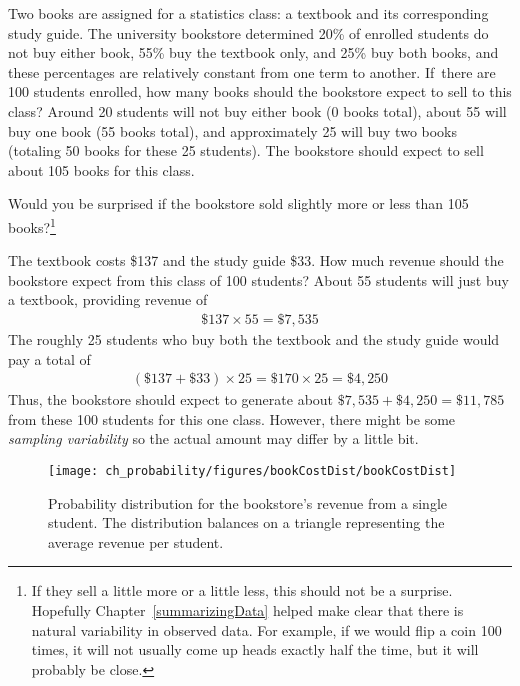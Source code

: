
\begin{example}{Two books are assigned for a statistics class: a textbook and its corresponding study guide. The university bookstore determined 20\% of enrolled students do not buy either book, 55\% buy the textbook only, and 25\% buy both books, and these percentages are relatively constant from one term to another. If~there are 100 students enrolled, how many books should the bookstore expect to sell to this class?}\label{bookStoreSales}
Around 20 students will not buy either book (0 books total), about 55 will buy one book (55 books total), and approximately 25 will buy two books (totaling 50 books for these 25 students). The bookstore should expect to sell about 105 books for this class.
\end{example}

\begin{exercise}
Would you be surprised if the bookstore sold slightly more or less than 105 books?\footnote{If they sell a little more or a little less, this should not be a surprise. Hopefully Chapter~\ref{summarizingData} helped make clear that there is natural variability in observed data. For example, if we would flip a coin 100 times, it will not usually come up heads exactly half the time, but it will probably be close.}
\end{exercise}

\begin{example}{The textbook costs \$137 and the study guide \$33. How much revenue should the bookstore expect from this class of 100 students?}\label{bookStoreRev}
About 55 students will just buy a textbook, providing revenue of
\begin{eqnarray*}
\$137 \times  55 = \$7,535
\end{eqnarray*}
The roughly 25 students who buy both the textbook and the study guide would pay a total of
\begin{eqnarray*}
(\$137 + \$33) \times  25 = \$170 \times  25 = \$4,250
\end{eqnarray*}
Thus, the bookstore should expect to generate about $\$7,535 + \$4,250 = \$11,785$ from these 100 students for this one class. However, there might be some \emph{sampling variability} so the actual amount may differ by a little bit.
\end{example}

\begin{figure}[hhh]
\centering
\texttt{[image: ch\_probability/figures/bookCostDist/bookCostDist]}
\caption{Probability distribution for the bookstore's revenue from a single student. The distribution balances on a triangle representing the average revenue per student.}
\label{bookCostDist}
\end{figure}

